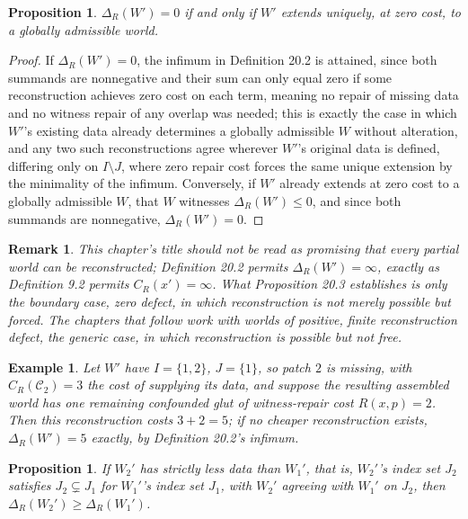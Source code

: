 \documentclass[11pt]{book}
\newtheorem{proposition}[theorem]{Proposition}
\newtheorem{remark}[theorem]{Remark}
\newtheorem{example}[theorem]{Example}
\begin{document}
\begin{proposition}
$\Delta_R(W') = 0$ if and only if $W'$ extends uniquely, at zero cost, to a globally admissible world.
\end{proposition}

\begin{proof}
If $\Delta_R(W') = 0$, the infimum in Definition 20.2 is attained, since both summands are nonnegative and their sum can only equal zero if some reconstruction achieves zero cost on each term, meaning no repair of missing data and no witness repair of any overlap was needed; this is exactly the case in which $W'$'s existing data already determines a globally admissible $W$ without alteration, and any two such reconstructions agree wherever $W'$'s original data is defined, differing only on $I \setminus J$, where zero repair cost forces the same unique extension by the minimality of the infimum. Conversely, if $W'$ already extends at zero cost to a globally admissible $W$, that $W$ witnesses $\Delta_R(W') \leq 0$, and since both summands are nonnegative, $\Delta_R(W') = 0$.
\end{proof}

\begin{remark}
This chapter's title should not be read as promising that every partial world can be reconstructed; Definition 20.2 permits $\Delta_R(W') = \infty$, exactly as Definition 9.2 permits $C_R(x') = \infty$. What Proposition 20.3 establishes is only the boundary case, zero defect, in which reconstruction is not merely possible but forced. The chapters that follow work with worlds of positive, finite reconstruction defect, the generic case, in which reconstruction is possible but not free.
\end{remark}

\begin{example}
Let $W'$ have $I = \{1,2\}$, $J = \{1\}$, so patch $2$ is missing, with $C_R(\mathcal C_2) = 3$ the cost of supplying its data, and suppose the resulting assembled world has one remaining confounded glut of witness-repair cost $R(x,p) = 2$. Then this reconstruction costs $3+2=5$; if no cheaper reconstruction exists, $\Delta_R(W') = 5$ exactly, by Definition 20.2's infimum.
\end{example}

\begin{proposition}
If $W_2'$ has strictly less data than $W_1'$, that is, $W_2'$'s index set $J_2$ satisfies $J_2 \subsetneq J_1$ for $W_1'$'s index set $J_1$, with $W_2'$ agreeing with $W_1'$ on $J_2$, then $\Delta_R(W_2') \geq \Delta_R(W_1')$.
\end{proposition}
\end{document}
